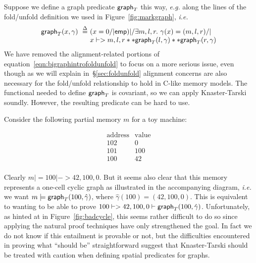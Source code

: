 
Suppose we define a graph predicate $\mathsf{graph}_T$ this way, \emph{e.g.} along the lines of the fold/unfold definition we used in Figure~\ref{fig:markgraph}, \emph{i.e.}
\[
\begin{array}{@{}l@{}l@{}}
\graphkt(x, \gamma) ~ \stackrel{\Delta}{=} ~ & (x = 0 /| \p{emp}) |/ \exists m,l,r.~ \gamma(x)=(m,l,r) /| \null \\
& x |-> m,l,r ** \graphkt(l, \gamma) ** \graphkt(r, \gamma)
\end{array}
\]
We have removed the alignment-related portions of equation~\eqref{eqn:bigraphintrofoldunfold} to focus on a more serious issue, even though as we will explain in~\S\ref{sec:foldunfold} alignment concerns are also necessary for the fold/unfold relationship to hold in C-like memory models.  The functional needed to define $\mathsf{graph}_T$ is covariant, so we can apply Knaster-Tarski soundly.  However, the resulting predicate can be hard to use.

Consider the following partial memory $m$ for a toy machine:

\begin{minipage}{.24\textwidth}
\qquad \[
\begin{array}{l|l}
\textrm{address} & \textrm{value} \\
\hline
102 & 0 \\
101 & 100 \\
100 & 42 \\
\end{array}
\]
\end{minipage}
\begin{minipage}{.19\textwidth}
\centering
{}
\endpgfgraphicnamed
\end{minipage}
\vspace{0.75ex}

\noindent Clearly $m |= 100 |-> 42,100,0$.  But it seems also clear that this memory represents a one-cell cyclic graph as illustrated in the accompanying diagram, \emph{i.e.} we want $m |= \mathsf{graph}_T(100,\hat{\gamma})$, where $\hat{\gamma}(100) = (42,100,0)$.  This is equivalent to wanting to be able to prove $100 |-> 42,100,0 |- \mathsf{graph}_T(100,\hat{\gamma})$.  Unfortunately, as hinted at in Figure~\ref{fig:badcycle}, this seems rather difficult to do so since applying the natural proof techniques have only strengthened the goal.  In fact we do not know if this entailment is provable or not, but the difficulties encountered in proving what ``should be'' straightforward suggest that Knaster-Tarski should be treated with caution when defining spatial predicates for graphs.


